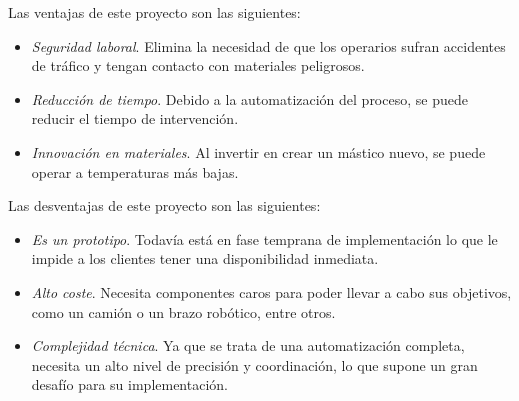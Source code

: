 Las ventajas de este proyecto son las siguientes:

\begin{itemize}
	\item \textit{Seguridad laboral}. Elimina la necesidad de que los operarios sufran accidentes de tráfico y tengan contacto con materiales peligrosos.
	\item \textit{Reducción de tiempo}. Debido a la automatización del proceso, se puede reducir el tiempo de intervención.
	\item \textit{Innovación en materiales}. Al invertir en crear un mástico nuevo, se puede operar a temperaturas más bajas.
\end{itemize}

Las desventajas de este proyecto son las siguientes:

\begin{itemize}
	\item \textit{Es un prototipo}. Todavía está en fase temprana de implementación lo que le impide a los clientes tener una disponibilidad inmediata.
	\item \textit{Alto coste}. Necesita componentes caros para poder llevar a cabo sus objetivos, como un camión o un brazo robótico, entre otros.
	\item \textit{Complejidad técnica}. Ya que se trata de una automatización completa, necesita un alto nivel de precisión y coordinación, lo que supone un gran desafío para su implementación.
\end{itemize}



